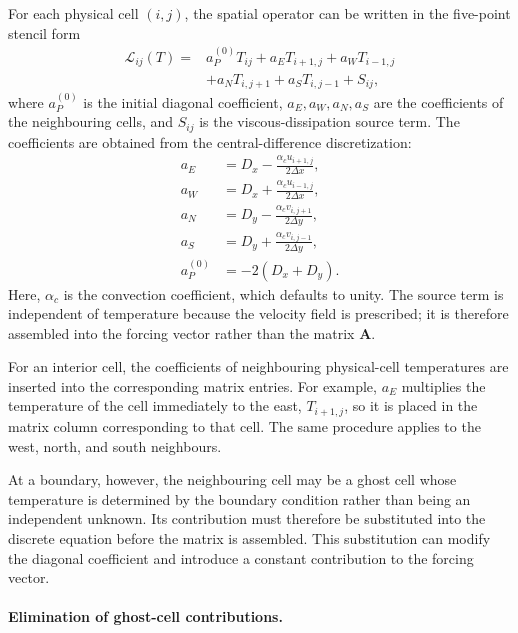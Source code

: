 For each physical cell $(i,j)$, the spatial operator can be
written in the five-point stencil form
\begin{equation}
\begin{aligned}
\mathcal{L}_{ij}(T)
={}&a_P^{(0)}T_{ij}
+a_E T_{i+1,j}
+a_W T_{i-1,j}\\
&+a_N T_{i,j+1}
+a_S T_{i,j-1}+S_{ij},
\end{aligned}
\label{eq:direct_five_point_stencil}
\end{equation}
where $a_P^{(0)}$ is the initial diagonal coefficient,
$a_E,a_W,a_N,a_S$ are the coefficients of the neighbouring
cells, and $S_{ij}$ is the viscous-dissipation source term.
The coefficients are obtained from the central-difference
discretization:
\begin{align}
a_E
&=D_x-\frac{\alpha_c u_{i+1,j}}{2\Delta x},
\label{eq:direct_coefficient_east}
\\
a_W
&=D_x+\frac{\alpha_c u_{i-1,j}}{2\Delta x},
\label{eq:direct_coefficient_west}
\\
a_N
&=D_y-\frac{\alpha_c v_{i,j+1}}{2\Delta y},
\label{eq:direct_coefficient_north}
\\
a_S
&=D_y+\frac{\alpha_c v_{i,j-1}}{2\Delta y},
\label{eq:direct_coefficient_south}
\\
a_P^{(0)}
&=-2(D_x+D_y).
\label{eq:direct_initial_diagonal}
\end{align}
Here, $\alpha_c$ is the convection coefficient, which defaults
to unity. The source term is independent of temperature
because the velocity field is prescribed; it is therefore
assembled into the forcing vector rather than the matrix
$\mathbf{A}$.

For an interior cell, the coefficients of neighbouring
physical-cell temperatures are inserted into the corresponding
matrix entries. For example, $a_E$ multiplies the temperature
of the cell immediately to the east, $T_{i+1,j}$, so it is
placed in the matrix column corresponding to that cell. The
same procedure applies to the west, north, and south
neighbours.

At a boundary, however, the neighbouring cell may be a ghost
cell whose temperature is determined by the boundary condition
rather than being an independent unknown. Its contribution
must therefore be substituted into the discrete equation
before the matrix is assembled. This substitution can modify
the diagonal coefficient and introduce a constant contribution
to the forcing vector.

\paragraph{Elimination of ghost-cell contributions.}

